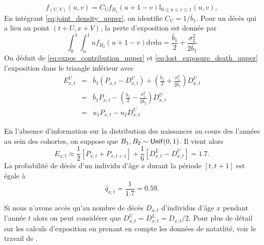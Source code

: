 \begin{equation}\label{eq:joint_density_upper}
f_{(U,V)}(u,v) = C_U f_{B_{1}}(u+1-v)\mathbb{I}_{0\leq u\leq v\leq 1}(u,v),
\end{equation}
En intégrant \eqref{eq:joint_density_upper}, on identifie $C_U = 1/\bar{b}_{1}$. Pour un décès qui a lieu au point $(t+U, x+V)$, la perte d'exposition est donnée par 
\begin{equation}\label{eq:lost_exposure_death_upper}
\int_{0}^1\int_{u}^1uf_{B_2}(u+1-v)\text{d}v\text{d}u = \frac{\bar{b}_1}{2}+\frac{\sigma_2^2}{2\bar{b}_1}
\end{equation}
On déduit de \eqref{eq:expos_contribution_upper} et \eqref{eq:lost_exposure_death_upper} l'exposition dans le triangle inférieur avec 
\begin{eqnarray*}
E^U_{x,t}&=&\bar{b}_1(P_{x,t}-D^U_{x,t}) + \left(\frac{\bar{b}_1}{2}+\frac{\sigma_1^2}{2\bar{b}_1}\right)D^U_{x,t}\\
& =& \bar{b}_1P_{x,t} - \left(\frac{\bar{b}_1}{2}-\frac{\sigma_1^2}{2\bar{b}_2}\right)D^U_{x,t}\\
&=& u_1P_{x,t} - u_2 D^U_{x,t}
\end{eqnarray*}

En l'absence d'information sur la distribution des naissances au cours des l'années au sein des cohortes, on suppose que $B_1,B_2\sim\mathsf{Unif}(0,1)$. Il vient alors
$$
E_{x,t} \approx  \frac{1}{2}[P_{x,t}+ P_{x,t+1}] + \frac{1}{6}[D^L_{x,t}- D^U_{x,t}] = 1.7.
$$
La probabilité de décès d'un individu d'âge $x$ durant la période $[t, t+1]$ est égale à 
$$
\widehat{q}_{x,t} = \frac{1}{1.7} = 0.59.
$$
\begin{remark}
Si nous n'avons accès qu'au nombre de décès $D_{x,t}$ d'individus d'âge $x$ pendant l'année $t$ alors on peut considérer que $D^U_{x,t} = D^L_{x,t} = D_{x,t} / 2$. Pour plus de détail sur les calculs d'exposition en prenant en compte les données de natatlité, voir le travail de \citet{Boumezoued2020}.
\end{remark}
